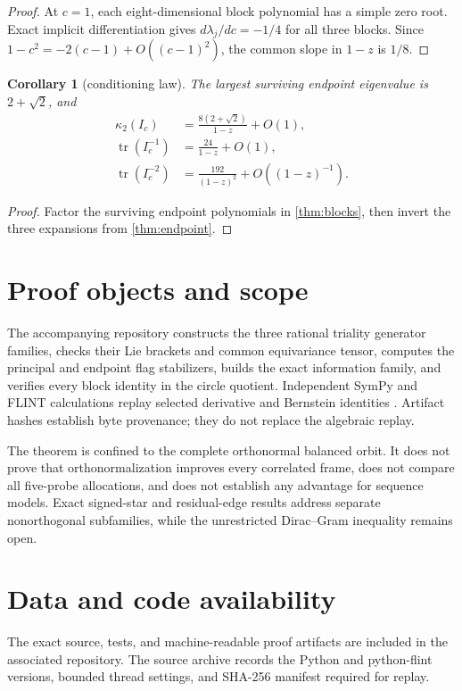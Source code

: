\documentclass[11pt]{amsart}
\newtheorem{corollary}[theorem]{Corollary}
\theoremstyle{remark}
\DeclareMathOperator{\tr}{tr}
\begin{document}
\begin{proof}
At $c=1$, each eight-dimensional block polynomial has a simple zero root.
Exact implicit differentiation gives $d\lambda_j/dc=-1/4$ for all three
blocks.  Since $1-c^2=-2(c-1)+O((c-1)^2)$, the common slope in $1-z$ is
$1/8$.
\end{proof}

\begin{corollary}[conditioning law]\label{cor:conditioning}
The largest surviving endpoint eigenvalue is $2+\sqrt2$, and
\begin{align*}
 \kappa_2(I_c)&=\frac{8(2+\sqrt2)}{1-z}+O(1),\\
 \tr(I_c^{-1})&=\frac{24}{1-z}+O(1),\\
 \tr(I_c^{-2})&=\frac{192}{(1-z)^2}+O((1-z)^{-1}).
\end{align*}
\end{corollary}

\begin{proof}
Factor the surviving endpoint polynomials in \cref{thm:blocks}, then invert
the three expansions from \cref{thm:endpoint}.
\end{proof}

\section{Proof objects and scope}

The accompanying repository constructs the three rational triality generator
families, checks their Lie brackets and common equivariance tensor, computes
the principal and endpoint flag stabilizers, builds the exact information
family, and verifies every block identity in the circle quotient.  Independent
SymPy and FLINT calculations replay selected derivative and Bernstein
identities \cite{Farouki2012}.  Artifact hashes establish byte provenance;
they do not replace the algebraic replay.

The theorem is confined to the complete orthonormal balanced orbit.  It does
not prove that orthonormalization improves every correlated frame, does not
compare all five-probe allocations, and does not establish any advantage for
sequence models.  Exact signed-star and residual-edge results address separate
nonorthogonal subfamilies, while the unrestricted Dirac--Gram inequality
remains open.

\section*{Data and code availability}

The exact source, tests, and machine-readable proof artifacts are included in
the associated repository.  The source archive records the Python and
python-flint versions, bounded thread settings, and SHA-256 manifest required
for replay.



\end{document}
